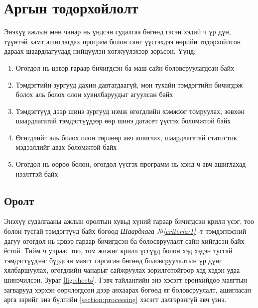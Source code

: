 \chapter{Аргын тодорхойлолт}

Энэхүү ажлын мөн чанар нь үндсэн судалгаа бөгөөд гэсэн хэдий ч үр дүн, түүнтэй хамт ашиглагдах програм болон санг үүсгэхдээ өөрийн тодорхойлсон дараах шаардлагуудад нийцүүлэн хөгжүүлэхээр зорьсон. Үүнд:

\begin{enumerate}
	\item Өгөгдөл нь цэвэр гараар бичигдсэн ба маш сайн боловсруулагдсан байх \label{criteria:1}
	\item Тэмдэгтийн зургууд дахин давтагдаагүй, мөн тухайн тэмдэгтийн бичигдэж болох аль болох олон хувилбаруудыг агуулсан байх \label{criteria:2}
	\item Тэмдэгтүүд дээр шинэ зургууд нэмж өгөгдлийн хэмжээг томруулах, зөвхөн шаардлагатай тэмдэгтүүдээр өөр шинэ датасет үүсгэх боломжтой байх \label{criteria:3}
	\item Өгөгдлийг аль болох олон төрлөөр авч ашиглах, шаардлагатай статистик мэдээллийг авах боломжтой байх \label{criteria:4}
	\item Өгөгдөл нь өөрөө болон, өгөгдөл үүсгэх программ нь хэнд ч авч ашиглахад нээлттэй байх \label{criteria:5}
\end{enumerate}

\section{Оролт}

Энэхүү судалгааны ажлын оролтын хувьд хүний гараар бичигдсэн крилл үсэг, тоо болон тусгай тэмдэгтүүд байх бөгөөд \textit{Шаардлага №\ref{criteria:1}} -т тэмдэглэсний дагуу өгөгдөл нь цэвэр гараар бичигдсэн ба болосвруулалт сайн хийгдсэн байх ёстой. Тийм ч учраас тоо, том жижиг крилл үсгүүд болон хэд хэдэн тусгай тэмдэгтүүдээс бүрдсэн маягт гаргасан бөгөөд боловсруулалтын үр дүнг хялбаршуулах, өгөгдлийн чанарыг сайжруулах зорилготойгоор хэд хэдэн удаа шинэчилсэн. Зураг \ref{fig:sheets}.
Гэвч тайлангийн энэ хэсэгт ерөнхийдөө маягтын загварууд хэрхэн өөрчлөгдсөн дээр анхаарах бөгөөд яг боловсруулалт, ашигласан арга зэрийг энэ бүлгийн \ref{section:processing} хэсэгт дэлгэрэнгүй авч үзнэ.


